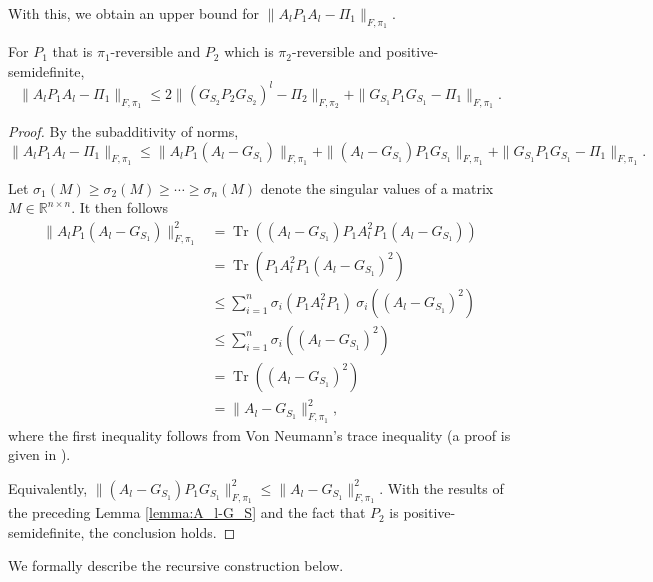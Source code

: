 \documentclass[EJP]{ejpecp} %
\DeclareMathOperator{\Tr}{Tr}
\begin{document}
With this, we obtain an upper bound for $\|A_l P_1 A_l -\Pi_1\|_{F, \pi_1}.$ 

\begin{proposition}\label{prop:normA_lPA_l}
    For $P_1$ that is $\pi_1$-reversible and $P_2$ which is $\pi_2$-reversible and positive-semidefinite, 
    $$\|A_l P_1 A_l -\Pi_1\|_{F, \pi_1} \leq 2\|(G_{S_2}P_2G_{S_2})^l - \Pi_{2}\|_{F, \pi_2} + \|G_{S_1}P_1G_{S_1} - \Pi_1\|_{F, \pi_1}.$$
\end{proposition}

\begin{proof}
    By the subadditivity of norms,
    $$\|A_l P_1 A_l - \Pi_1\|_{F,\pi_1} \leq \|A_l P_1 (A_l-G_{S_1})\|_{F,\pi_1} + \|(A_l-G_{S_1})P_1G_{S_1}\|_{F,\pi_1} + \|G_{S_1}P_1G_{S_1}-\Pi_1\|_{F,\pi_1}.$$

    Let $\sigma_1(M) \geq \sigma_2(M) \geq \cdots \geq \sigma_n(M)$ denote the singular values of a matrix $M \in \mathbb{R}^{n \times n}$. It then follows 
    \begin{align*}
        \|A_l P_1 (A_l-G_{S_1})\|_{F,\pi_1}^2 &= \Tr((A_l-G_{S_1}) P_1 A_l^2 P_1 (A_l-G_{S_1}))\\
        &= \Tr(P_1 A_l^2 P_1 (A_l-G_{S_1})^2)\\
        &\leq \sum_{i=1}^n \sigma_i\left(P_1 A_l^2 P_1\right) \ \sigma_i \left((A_l-G_{S_1})^2\right)\\
        & \leq \sum_{i=1}^n\sigma_i \left((A_l-G_{S_1})^2\right)\\
        &= \Tr\left((A_l-G_{S_1})^2\right) \\
        &= \| A_l - G_{S_1}\|_{F,\pi_1}^2,
    \end{align*}
    where the first inequality follows from Von Neumann's trace inequality (a proof is given in \cite{mirsky}). 

    Equivalently, $\|(A_l-G_{S_1})P_1G_{S_1}\|_{F,\pi_1}^2 \leq \| A_l - G_{S_1}\|_{F,\pi_1}^2$.  With the results of the preceding Lemma \ref{lemma:A_l-G_S} and the fact that $P_2$ is positive-semidefinite, the conclusion holds.
\end{proof}

We formally describe the recursive construction below.\\
\end{document}
